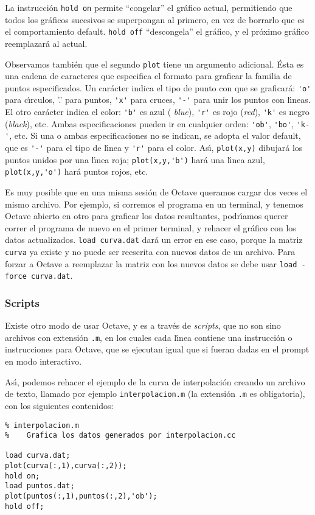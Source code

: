 \documentclass[12pt]{article}
\begin{document}
La instrucci\'on \verb+hold on+ permite ``congelar'' el
gr\'afico actual, permitiendo que todos los gr\'aficos sucesivos se
superpongan al primero, en vez de borrarlo que es el comportamiento
default. \verb+hold off+ ``descongela'' el gr\'afico, y el pr\'oximo
gr\'afico reemplazar\'a al actual.

Observamos tambi\'en que el segundo  \verb+plot+ tiene un argumento
adicional. \'Esta es una cadena de caracteres que especifica el formato
para graficar la familia de puntos especificados. Un car\'acter indica
el tipo de punto con que se graficar\'a: \verb+'o'+ para c\'{\i}rculos, '.'
para puntos, \verb+'x'+ para cruces, \verb+'-'+ para unir los puntos con
l\'{\i}neas. El otro car\'acter indica el color: \verb+'b'+ es azul ({\it
  blue\/}), \verb+'r'+ es rojo ({\it red\/}), \verb+'k'+
 es negro ({\it black\/}),
etc\@. Ambas especificaciones pueden ir en cualquier orden:
\verb+'ob'+, \verb+'bo'+, \verb+'k-'+, etc\@. Si una o ambas
especificaciones no se indican, se adopta el valor default, que es
\verb+'-'+ para el tipo de l\'{\i}nea y \verb+'r'+ para el
color. As\'{\i}, \verb+plot(x,y)+ dibujar\'a los puntos unidos por una
l\'{\i}nea roja; \verb+plot(x,y,'b')+ har\'a una l\'{\i}nea azul,
\verb+plot(x,y,'o')+ har\'a puntos rojos, etc. 

Es muy posible que en una misma sesi\'on de Octave queramos cargar dos
veces el mismo archivo. Por ejemplo, si corremos el programa en un
terminal, y tenemos Octave abierto en otro para graficar los datos
resultantes, podr\'{\i}amos querer correr el programa de nuevo en el
primer terminal, y rehacer el gr\'afico con los datos actualizados. 
\verb+load curva.dat+ dar\'a un error en ese caso, porque la matriz
\verb+curva+ ya existe y no puede ser reescrita con nuevos datos de un
archivo. Para forzar a Octave a reemplazar la matriz con los nuevos
datos se debe usar \verb+load -force curva.dat+. 


\subsubsection{Scripts}

Existe otro modo de usar Octave, y es a trav\'es de {\it scripts}, que
no son sino archivos con extensi\'on \verb+.m+, en los cuales cada
l\'{\i}nea contiene una instrucci\'on o instrucciones para Octave, que
se ejecutan igual que si fueran dadas en el prompt en modo
interactivo.

As\'{\i}, podemos rehacer el ejemplo de la curva de interpolaci\'on
creando un archivo de texto, llamado por ejemplo
\verb+interpolacion.m+ (la extensi\'on \verb+.m+ es obligatoria), con
los siguientes contenidos:
\begin{verbatim}
% interpolacion.m
%    Grafica los datos generados por interpolacion.cc

load curva.dat;
plot(curva(:,1),curva(:,2));
hold on;
load puntos.dat;
plot(puntos(:,1),puntos(:,2),'ob');
hold off;
\end{verbatim}
\end{document}
